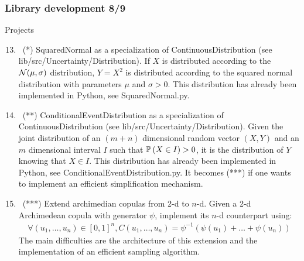 \documentclass[8pt]{beamer}
\begin{document}
\begin{frame}
  \frametitle{Library development 8/9}
  \begin{block}{Projects}
    \begin{enumerate}
      \setcounter{enumi}{12}
    \item~(*) \alert{\ttfamily SquaredNormal} as a specialization of {\ttfamily ContinuousDistribution} (see {\ttfamily lib/src/Uncertainty/Distribution}). If $X$ is distributed according to the ${\mathcal N}(\mu,\sigma)$ distribution, $Y=X^2$ is distributed according to the squared normal distribution with parameters $\mu$ and $\sigma>0$. This distribution has already been implemented in Python, see {\ttfamily SquaredNormal.py}.
    \item~(**) \alert{\ttfamily ConditionalEventDistribution} as a specialization of {\ttfamily ContinuousDistribution} (see {\ttfamily lib/src/Uncertainty/Distribution}). Given the joint distribution of an $(m+n)$ dimensional random vector $(X,Y)$ and an $m$ dimensional interval $I$ such that ${\mathbb P}\left( X\in I \right)>0$, it is the distribution of $Y$ knowing that $X\in I$. This distribution has already been implemented in Python, see {\ttfamily ConditionalEventDistribution.py}. It becomes (***) if one wants to implement an efficient simplification mechanism.
    \item~(***) Extend archimedian copulas from 2-d to $n$-d. Given a 2-d Archimedean copula with generator $\psi$, implement its $n$-d counterpart using:
      \begin{align}
        \forall (u_1,\dots,u_n)\in[0,1]^n, C(u_1,\dots,u_n)=\psi^{-1}\left(\psi(u_1)+\dots+\psi(u_n)\right)
      \end{align}
      The main difficulties are the architecture of this extension and the implementation of an efficient sampling algorithm.
    \end{enumerate}
  \end{block}
\end{frame}
\end{document}
